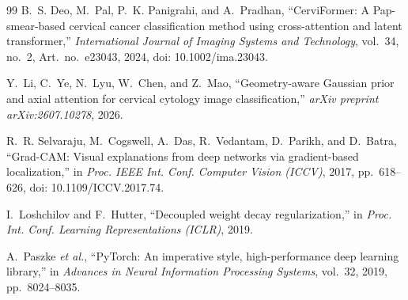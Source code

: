 \documentclass[10pt,conference]{IEEEtran}
\begin{document}
\begin{thebibliography}{99}
B.~S. Deo, M.~Pal, P.~K. Panigrahi, and A.~Pradhan,
``CerviFormer: A Pap-smear-based cervical cancer classification method using cross-attention and latent transformer,''
\emph{International Journal of Imaging Systems and Technology},
vol.~34, no.~2, Art.~no.~e23043, 2024,
doi: 10.1002/ima.23043.

Y.~Li, C.~Ye, N.~Lyu, W.~Chen, and Z.~Mao,
``Geometry-aware Gaussian prior and axial attention for cervical cytology image classification,''
\emph{arXiv preprint arXiv:2607.10278}, 2026.

R.~R. Selvaraju, M.~Cogswell, A.~Das, R.~Vedantam,
D.~Parikh, and D.~Batra,
``Grad-CAM: Visual explanations from deep networks via gradient-based localization,''
in \emph{Proc. IEEE Int. Conf. Computer Vision (ICCV)},
2017, pp.~618--626,
doi: 10.1109/ICCV.2017.74.

I.~Loshchilov and F.~Hutter,
``Decoupled weight decay regularization,''
in \emph{Proc. Int. Conf. Learning Representations (ICLR)}, 2019.

A.~Paszke \emph{et al.},
``PyTorch: An imperative style, high-performance deep learning library,''
in \emph{Advances in Neural Information Processing Systems},
vol.~32, 2019, pp.~8024--8035.

\end{thebibliography}
\end{document}
